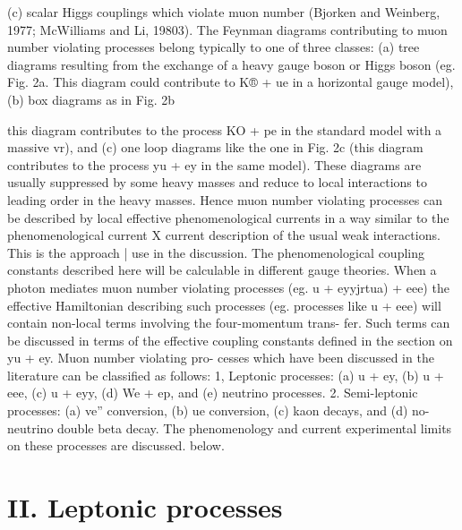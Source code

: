 \documentclass[twoside]{article}
\begin{document}
{{{{{(c) scalar Higgs couplings which violate muon number (Bjorken and Weinberg,
1977; McWilliams and Li, 19803). The Feynman diagrams contributing to muon
number violating processes belong typically to one of three classes:
(a) tree diagrams resulting from the exchange of a heavy gauge boson or
Higgs boson (eg. Fig. 2a. This diagram could contribute to K® + ue in
a horizontal gauge model), (b) box diagrams as in Fig. 2b {this diagram
contributes to the process KO + pe in the standard model with a
massive vr), and (c) one loop diagrams like the one in Fig. 2c (this
diagram contributes to the process yu + ey in the same model). These
diagrams are usually suppressed by some heavy masses and reduce to local
interactions to leading order in the heavy masses. Hence muon number
violating processes can be described by local effective phenomenological
currents in a way similar to the phenomenological current X current
description of the usual weak interactions. This is the approach | use
in the discussion. The phenomenological coupling constants described
here will be calculable in different gauge theories. When a photon
mediates muon number violating processes (eg. u + eyyjrtua) + eee) the
effective Hamiltonian describing such processes (eg. processes like
u + eee) will contain non-local terms involving the four-momentum trans-
fer. Such terms can be discussed in terms of the effective coupling
constants defined in the section on yu + ey. Muon number violating pro-
cesses which have been discussed in the literature can be classified as
follows: 1, Leptonic processes: (a) u + ey, (b) u + eee, (c) u + eyy,
(d) We + ep, and (e) neutrino processes. 2. Semi-leptonic processes:
(a) ve” conversion, (b) ue conversion, (c) kaon decays, and (d) no-
neutrino double beta decay. The phenomenology and current experimental
limits on these processes are discussed. below.


\section{\label{sec2}II. Leptonic processes}

}}}}}}
\end{document}
